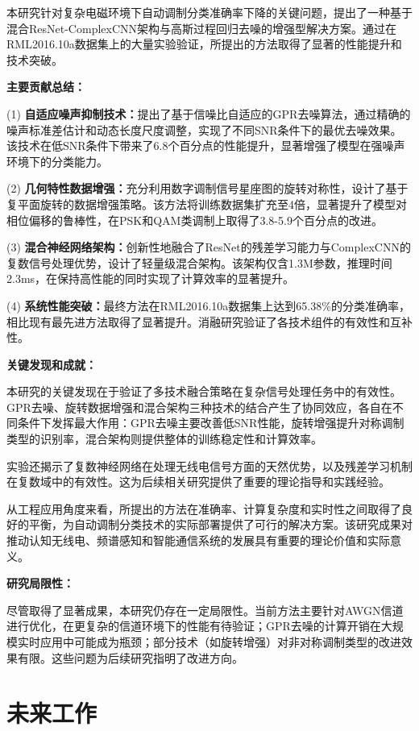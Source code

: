\documentclass[conference]{IEEEtran}
\begin{document}
本研究针对复杂电磁环境下自动调制分类准确率下降的关键问题，提出了一种基于混合ResNet-ComplexCNN架构与高斯过程回归去噪的增强型解决方案。通过在RML2016.10a数据集上的大量实验验证，所提出的方法取得了显著的性能提升和技术突破。

\textbf{主要贡献总结：}

(1) \textbf{自适应噪声抑制技术：}提出了基于信噪比自适应的GPR去噪算法，通过精确的噪声标准差估计和动态长度尺度调整，实现了不同SNR条件下的最优去噪效果。该技术在低SNR条件下带来了6.8个百分点的性能提升，显著增强了模型在强噪声环境下的分类能力。

(2) \textbf{几何特性数据增强：}充分利用数字调制信号星座图的旋转对称性，设计了基于复平面旋转的数据增强策略。该方法将训练数据集扩充至4倍，显著提升了模型对相位偏移的鲁棒性，在PSK和QAM类调制上取得了3.8-5.9个百分点的改进。

(3) \textbf{混合神经网络架构：}创新性地融合了ResNet的残差学习能力与ComplexCNN的复数信号处理优势，设计了轻量级混合架构。该架构仅含1.3M参数，推理时间2.3ms，在保持高性能的同时实现了计算效率的显著提升。

(4) \textbf{系统性能突破：}最终方法在RML2016.10a数据集上达到65.38\%的分类准确率，相比现有最先进方法取得了显著提升。消融研究验证了各技术组件的有效性和互补性。

\textbf{关键发现和成就：}

本研究的关键发现在于验证了多技术融合策略在复杂信号处理任务中的有效性。GPR去噪、旋转数据增强和混合架构三种技术的结合产生了协同效应，各自在不同条件下发挥最大作用：GPR去噪主要改善低SNR性能，旋转增强提升对称调制类型的识别率，混合架构则提供整体的训练稳定性和计算效率。

实验还揭示了复数神经网络在处理无线电信号方面的天然优势，以及残差学习机制在复数域中的有效性。这为后续相关研究提供了重要的理论指导和实践经验。

从工程应用角度来看，所提出的方法在准确率、计算复杂度和实时性之间取得了良好的平衡，为自动调制分类技术的实际部署提供了可行的解决方案。该研究成果对推动认知无线电、频谱感知和智能通信系统的发展具有重要的理论价值和实际意义。

\textbf{研究局限性：}

尽管取得了显著成果，本研究仍存在一定局限性。当前方法主要针对AWGN信道进行优化，在更复杂的信道环境下的性能有待验证；GPR去噪的计算开销在大规模实时应用中可能成为瓶颈；部分技术（如旋转增强）对非对称调制类型的改进效果有限。这些问题为后续研究指明了改进方向。

\section{未来工作}
\end{document}
